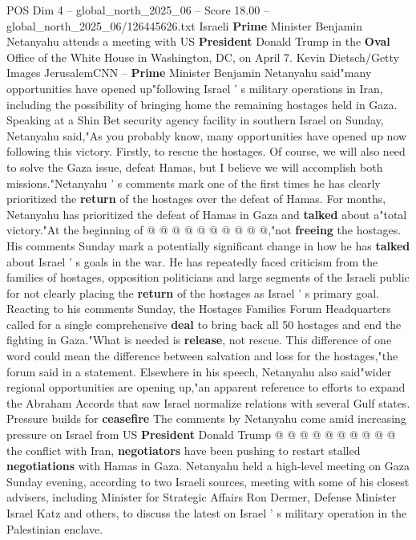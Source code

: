 \begin{textsample}{POS Dim 4 – global\_north\_2025\_06 – Score 18.00 – global\_north\_2025\_06/126445626.txt}  \label{ex:f4_pos_399}
Israeli \textbf{Prime} Minister Benjamin Netanyahu attends a meeting with US \textbf{President} Donald Trump in the \textbf{Oval} Office of the White House in Washington, DC, on April 7.
Kevin Dietsch/Getty Images JerusalemCNN -- \textbf{Prime} Minister Benjamin Netanyahu said"many opportunities have opened up"following Israel ' s military operations in Iran, including the possibility of bringing home the remaining hostages held in Gaza.
Speaking at a Shin Bet security agency facility in southern Israel on Sunday, Netanyahu said,"As you probably know, many opportunities have opened up now following this victory.
Firstly, to rescue the hostages.
Of course, we will also need to solve the Gaza issue, defeat Hamas, but I believe we will accomplish both missions."Netanyahu ' s comments mark one of the first times he has clearly prioritized the \textbf{return} of the hostages over the defeat of Hamas.
For months, Netanyahu has prioritized the defeat of Hamas in Gaza and \textbf{talked} about a"total victory."At the beginning of @ @ @ @ @ @ @ @ @ @,"not \textbf{freeing} the hostages.
His comments Sunday mark a potentially significant change in how he has \textbf{talked} about Israel ' s goals in the war.
He has repeatedly faced criticism from the families of hostages, opposition politicians and large segments of the Israeli public for not clearly placing the \textbf{return} of the hostages as Israel ' s primary goal.
Reacting to his comments Sunday, the Hostages Families Forum Headquarters called for a single comprehensive \textbf{deal} to bring back all 50 hostages and end the fighting in Gaza."What is needed is \textbf{release}, not rescue.
This difference of one word could mean the difference between salvation and loss for the hostages,"the forum said in a statement.
Elsewhere in his speech, Netanyahu also said"wider regional opportunities are opening up,"an apparent reference to efforts to expand the Abraham Accords that saw Israel normalize relations with several Gulf states.
Pressure builds for \textbf{ceasefire} The comments by Netanyahu come amid increasing pressure on Israel from US \textbf{President} Donald Trump @ @ @ @ @ @ @ @ @ @ the conflict with Iran, \textbf{negotiators} have been pushing to restart stalled \textbf{negotiations} with Hamas in Gaza.
Netanyahu held a high-level meeting on Gaza Sunday evening, according to two Israeli sources, meeting with some of his closest advisers, including Minister for Strategic Affairs Ron Dermer, Defense Minister Israel Katz and others, to discuss the latest on Israel ' s military operation in the Palestinian enclave.

\end{textsample}
